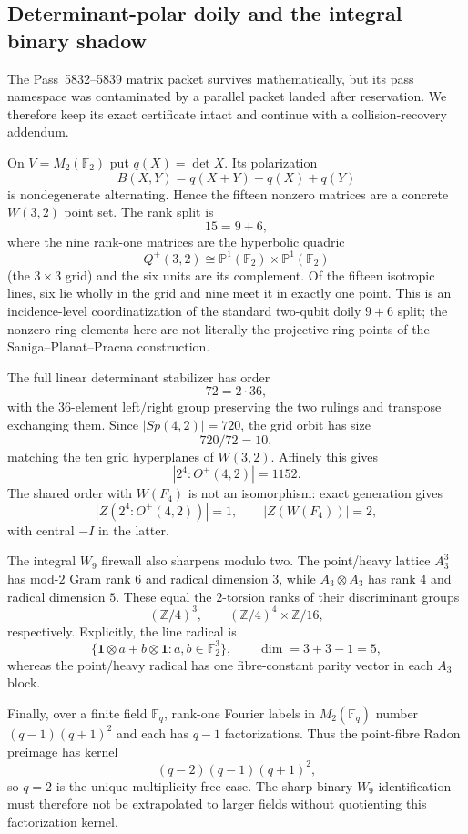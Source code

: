 \subsection*{Determinant-polar doily and the integral binary shadow}

The Pass~5832--5839 matrix packet survives mathematically, but its pass namespace
was contaminated by a parallel packet landed after reservation.  We therefore keep
its exact certificate intact and continue with a collision-recovery addendum.

On $V=M_2(\mathbb F_2)$ put $q(X)=\det X$.  Its polarization
\[
B(X,Y)=q(X+Y)+q(X)+q(Y)
\]
is nondegenerate alternating.  Hence the fifteen nonzero matrices are a concrete
$W(3,2)$ point set.  The rank split is
\[
15=9+6,
\]
where the nine rank-one matrices are the hyperbolic quadric
\[
Q^+(3,2)\cong \mathbb P^1(\mathbb F_2)\times\mathbb P^1(\mathbb F_2)
\]
(the $3\times3$ grid) and the six units are its complement.  Of the fifteen
isotropic lines, six lie wholly in the grid and nine meet it in exactly one point.
This is an incidence-level coordinatization of the standard two-qubit doily $9+6$
split; the nonzero ring elements here are not literally the projective-ring points
of the Saniga--Planat--Pracna construction.

The full linear determinant stabilizer has order
\[
72=2\cdot36,
\]
with the $36$-element left/right group preserving the two rulings and transpose
exchanging them.  Since $|Sp(4,2)|=720$, the grid orbit has size
\[
720/72=10,
\]
matching the ten grid hyperplanes of $W(3,2)$.  Affinely this gives
\[
|2^4:O^+(4,2)|=1152.
\]
The shared order with $W(F_4)$ is not an isomorphism: exact generation gives
\[
|Z(2^4:O^+(4,2))|=1,
\qquad
|Z(W(F_4))|=2,
\]
with central $-I$ in the latter.

The integral $W_9$ firewall also sharpens modulo two.  The point/heavy lattice
$A_3^3$ has mod-$2$ Gram rank $6$ and radical dimension $3$, while
$A_3\otimes A_3$ has rank $4$ and radical dimension $5$.  These equal the
$2$-torsion ranks of their discriminant groups
\[
(\mathbb Z/4)^3,
\qquad
(\mathbb Z/4)^4\times\mathbb Z/16,
\]
respectively.  Explicitly, the line radical is
\[
\{\mathbf 1\otimes a+b\otimes\mathbf 1:a,b\in\mathbb F_2^3\},
\qquad \dim=3+3-1=5,
\]
whereas the point/heavy radical has one fibre-constant parity vector in each
$A_3$ block.

Finally, over a finite field $\mathbb F_q$, rank-one Fourier labels in
$M_2(\mathbb F_q)$ number $(q-1)(q+1)^2$ and each has $q-1$
factorizations.  Thus the point-fibre Radon preimage has kernel
\[
\boxed{(q-2)(q-1)(q+1)^2},
\]
so $q=2$ is the unique multiplicity-free case.  The sharp binary $W_9$
identification must therefore not be extrapolated to larger fields without
quotienting this factorization kernel.

